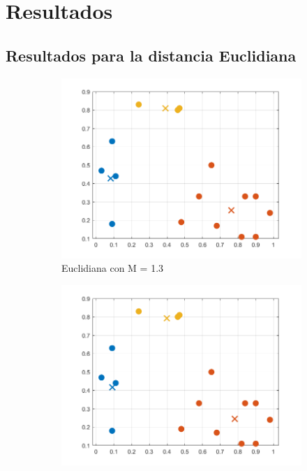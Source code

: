 \documentclass[11pt, letterpaper]{article}
\begin{document}
\newpage



\section{Resultados}

\subsection{Resultados para la distancia Euclidiana}

\begin{figure}[h!]
	\centering
	\begin{subfigure}[b]{0.50\textwidth}
		\includegraphics[width=\textwidth]{IMG/R11.png}
		\caption{Euclidiana con M = 1.3}
		\label{fig:r1}
	\end{subfigure}\hfill
	\begin{subfigure}[b]{0.50\textwidth}
		\includegraphics[width=\textwidth]{IMG/R12.png}

\end{subfigure}
\end{figure}
\end{document}
